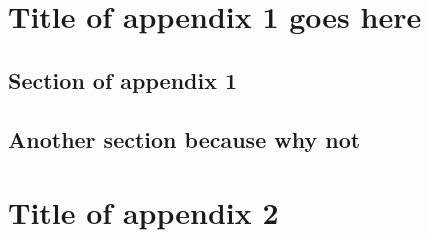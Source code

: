 \appendix
\appendixpage
\addappheadtotoc

\chapter{Title of appendix 1 goes here}
\label{ch:app_addref}

\lipsum[1]

\section{Section of appendix 1}

\lipsum[2]

\section{Another section because why not}

\lipsum[3]

\chapter{Title of appendix 2}
\label{ch:app_addref2}

\lipsum[4]